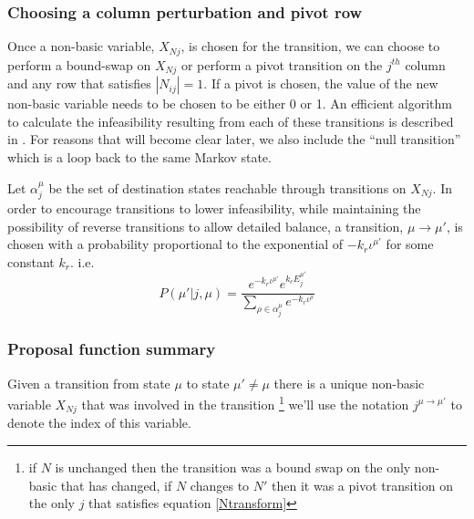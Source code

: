 \documentclass{article}
\begin{document}
\subsubsection{Choosing a column perturbation and pivot row}

Once a non-basic variable, $X_{Nj}$, is chosen for the transition, we can choose to perform a bound-swap on $X_{Nj}$ or perform a pivot transition on the $j^{th}$ column and any row that satisfies $|N_{ij}|=1$. If a pivot is chosen, the value of the new non-basic variable needs to be chosen to be either 0 or 1. An efficient algorithm to calculate the infeasibility resulting from each of these transitions is described in \cite[Chapter~9]{maros2002computational}. For reasons that will become clear later, we also include the ``null transition'' which is a loop back to the same Markov state.

Let $\alpha^\mu_j$ be the set of destination states reachable through transitions on $X_{Nj}$. In order to encourage transitions to lower infeasibility, while maintaining the possibility of reverse transitions to allow detailed balance, a transition, $\mu\to\mu'$, is chosen with a probability proportional to the exponential of $-k_r\iota^{\mu'}$ for some constant $k_r$. i.e.
\begin{equation}
P(\mu'|j,\mu) = 
\frac{e^{-k_r\iota^{\mu'}}e^{k_cE^{\mu'}_j} }
	{\sum_{\rho \in \alpha^\mu_j}  e^{-k_r\iota^\rho}}
\label{pTransitionGivenJ}
\end{equation}

\subsubsection{Proposal function summary}

Given a transition from state $\mu$ to state $\mu' \ne \mu$ there is a unique non-basic variable $X_{Nj}$ that was involved in the transition \footnote{if $N$ is unchanged then the transition was a bound swap on the only non-basic that has changed, if $N$ changes to $N'$ then it was a pivot transition on the only $j$ that satisfies equation \eqref{Ntransform}} we'll use the notation $j^{\mu\to\mu'}$ to denote the index of this variable.
\end{document}
